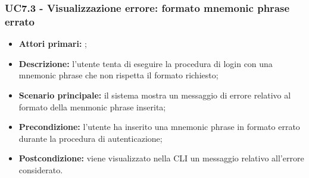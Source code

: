 \subsubsection{UC7.3 - Visualizzazione errore: formato mnemonic phrase errato}
\begin{itemize}
	\item \textbf{Attori primari:} \una{};
	\item \textbf{Descrizione:} l’utente tenta di eseguire la procedura di login con una mnemonic phrase che non rispetta il formato richiesto;  
	\item \textbf{Scenario principale:} il sistema mostra un messaggio di errore relativo al formato della menmonic phrase inserita;
	\item \textbf{Precondizione:} l'utente ha inserito una mnemonic phrase in formato errato durante la procedura di autenticazione; 
	\item \textbf{Postcondizione:} viene visualizzato nella CLI un messaggio relativo all’errore considerato.  
\end{itemize}
